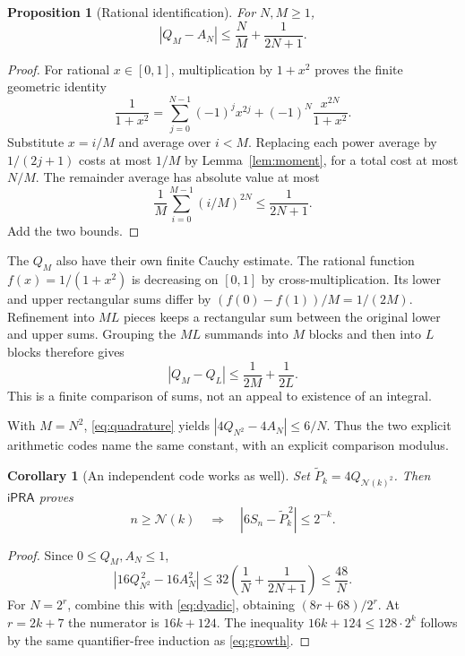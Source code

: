 \documentclass[11pt,a4paper]{article}
\newtheorem{proposition}[theorem]{Proposition}
\newtheorem{corollary}[theorem]{Corollary}
\theoremstyle{remark}\newtheorem{remark}[theorem]{Remark}
\newcommand{\ipra}{\mathsf{iPRA}}
\newcommand{\abs}[1]{\left|#1\right|}
\newcommand{\cut}{\mathcal N}
\begin{document}
\begin{proposition}[Rational identification]\label{prop:quadrature}
For $N,M\ge1$,
\begin{equation}\label{eq:quadrature}
 \abs{Q_M-A_N}\le\frac NM+\frac1{2N+1}.
\end{equation}
\end{proposition}
\begin{proof}
For rational $x\in[0,1]$, multiplication by $1+x^2$ proves
the finite geometric identity
\begin{equation}\label{eq:geometric}
 \frac1{1+x^2}
 =\sum_{j=0}^{N-1}(-1)^j x^{2j}
  +(-1)^N\frac{x^{2N}}{1+x^2}.
\end{equation}
Substitute $x=i/M$ and average over $i<M$.
Replacing each power average by $1/(2j+1)$ costs at most $1/M$
by Lemma~\ref{lem:moment}, for a total cost at most $N/M$.
The remainder average has absolute value at most
\[
 \frac1M\sum_{i=0}^{M-1}(i/M)^{2N}\le\frac1{2N+1}.
\]
Add the two bounds.
\end{proof}

The $Q_M$ also have their own finite Cauchy estimate. The rational
function $f(x)=1/(1+x^2)$ is decreasing on $[0,1]$ by
cross-multiplication. Its lower and upper rectangular sums differ
by $(f(0)-f(1))/M=1/(2M)$. Refinement into $ML$ pieces keeps a
rectangular sum between the original lower and upper sums.
Grouping the $ML$ summands into $M$ blocks and then into $L$ blocks
therefore gives
\begin{equation}\label{eq:Qmodulus}
 \abs{Q_M-Q_L}\le\frac1{2M}+\frac1{2L}.
\end{equation}
This is a finite comparison of sums, not an appeal to existence of
an integral.

With $M=N^2$, \eqref{eq:quadrature} yields
$\abs{4Q_{N^2}-4A_N}\le6/N$. Thus the two explicit arithmetic
codes name the same constant, with an explicit comparison modulus.

\begin{corollary}[An independent code works as well]\label{cor:riemann}
Set $\widetilde P_k=4Q_{\cut(k)^2}$. Then $\ipra$ proves
\[
 n\ge\cut(k)\quad\Longrightarrow\quad
 \abs{6S_n-\widetilde P_k^{\,2}}\le2^{-k}.
\]
\end{corollary}
\begin{proof}
Since $0\le Q_M,A_N\le1$,
\[
 \abs{16Q_{N^2}^{\,2}-16A_N^2}
 \le32\left(\frac1N+\frac1{2N+1}\right)\le\frac{48}{N}.
\]
For $N=2^r$, combine this with \eqref{eq:dyadic}, obtaining
$(8r+68)/2^r$. At $r=2k+7$ the numerator is $16k+124$.
The inequality $16k+124\le128\cdot2^k$ follows by the same
quantifier-free induction as \eqref{eq:growth}.
\end{proof}
\end{document}
